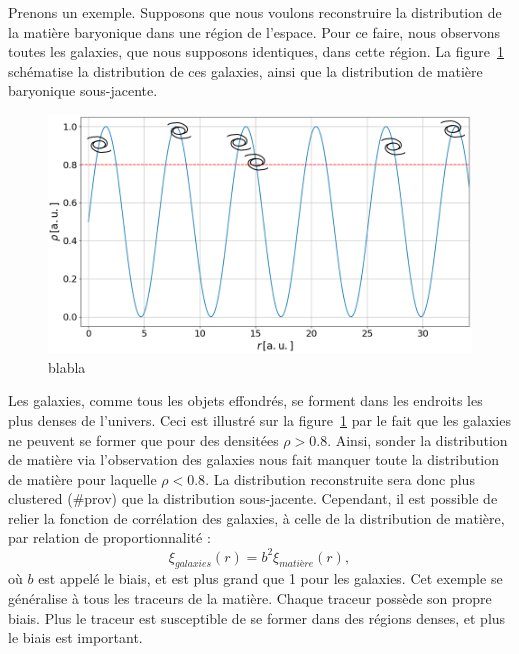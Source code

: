 \documentclass[11pt, twoside, a4paper, openright]{report}
\begin{document}
Prenons un exemple. Supposons que nous voulons reconstruire la distribution de la matière baryonique dans une région de l'espace. Pour ce faire, nous observons toutes les galaxies, que nous supposons identiques, dans cette région. La figure~\ref{fig:schema_biais} schématise la distribution de ces galaxies, ainsi que la distribution de matière baryonique sous-jacente.
\begin{figure}
  \centering
  \includegraphics[scale=0.4]{schema_biais}
  \caption{blabla}
  \label{fig:schema_biais}
\end{figure}
Les galaxies, comme tous les objets effondrés, se forment dans les endroits les plus denses de l'univers. Ceci est illustré sur la figure~\ref{fig:schema_biais} par le fait que les galaxies ne peuvent se former que pour des densitées $\rho > 0.8$. Ainsi, sonder la distribution de matière via l'observation des galaxies nous fait manquer toute la distribution de matière pour laquelle $\rho < 0.8$. La distribution reconstruite sera donc plus clustered (\#prov) que la distribution sous-jacente. Cependant, il est possible de relier la fonction de corrélation des galaxies, à celle de la distribution de matière, par relation de proportionnalité :
\begin{equation}
  \label{eq:biais1}
  \xi_{galaxies}(r) = b^2 \xi_{matière}(r) ,
\end{equation}
où $b$ est appelé le biais, et est plus grand que 1 pour les galaxies. Cet exemple se généralise à tous les traceurs de la matière. Chaque traceur possède son propre biais. Plus le traceur est susceptible de se former dans des régions denses, et plus le biais est important.
\end{document}
